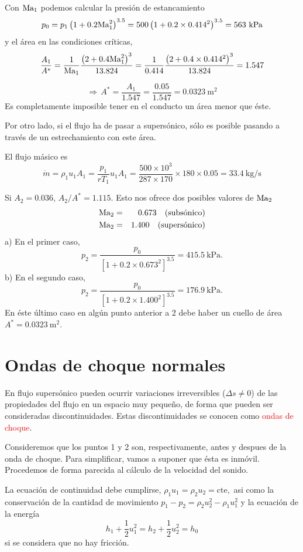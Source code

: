 		Con $\text{Ma}_{1}$ podemos calcular la presión de estancamiento 
		\[
		p_{0}=p_{1}\left(1+0.2\text{Ma}_{1}^{2}\right)^{3.5}=500\left(1+0.2\times0.414^{2}\right)^{3.5}=563~\text{kPa}
		\]
		y el área en las condiciones críticas, 
		\[
		\frac{A_{1}}{A^{*}}=\frac{1}{\text{Ma}_{1}}\frac{\left(2+0.4\text{Ma}_{1}^{2}\right)^{3}}{13.824}=\frac{1}{0.414}\frac{\left(2+0.4\times0.414^{2}\right)^{3}}{13.824}=1.547
		\]
		
		\[
		\Rightarrow\,A^{*}=\frac{A_{1}}{1.547}=\frac{0.05}{1.547}=0.0323~\text{m}^{2}
		\]
		Es completamente imposible tener en el conducto un área menor que
		éste.
		
		Por otro lado, si el flujo ha de pasar a supersónico, sólo es posible
		pasando a través de un estrechamiento con este área.
		
		El flujo másico es 
		\[
		\dot{m}=\rho_{1}u_{1}A_{1}=\frac{p_{1}}{rT_{1}}u_{1}A_{1}=\frac{500\times10^{3}}{287\times170}\times180\times0.05=33.4~\text{kg/s}
		\]

		Si $A_{2}=0.036$, $A_{2}/A^{*}=1.115$. Esto nos ofrece dos posibles
		valores de $\text{Ma}_{2}$ 
		\begin{eqnarray*}
			\text{Ma}_{2} & = & 0.673\quad\text{(subsónico)}\\
			\text{Ma}_{2} & = & 1.400\quad\text{(supersónico)}
		\end{eqnarray*}
		a) En el primer caso, 
		\[
		p_{2}=\frac{p_{0}}{\left[1+0.2\times0.673^{2}\right]^{3.5}}=415.5~\text{kPa}.
		\]
		b) En el segundo caso, 
		\[
		p_{2}=\frac{p_{0}}{\left[1+0.2\times1.400^{2}\right]^{3.5}}=176.9~\text{kPa}.
		\]
		En éste último caso en algún punto anterior a 2 debe haber un cuello
		de área $A^{*}=0.0323~\text{m}^{2}$.


\section{Ondas de choque normales}
	
	En flujo supersónico pueden ocurrir variaciones irreversibles ($\Delta s\neq0$)
	de las propiedades del flujo en un espacio muy pequeño, de forma que
	pueden ser consideradas discontinuidades. Estas discontinuidades se
	conocen como \textcolor{red}{ondas de choque}.
	
	Consideremos que los puntos 1 y 2 son, respectivamente, antes y despues
	de la onda de choque. Para simplificar, vamos a suponer que ésta es
	inmóvil. Procedemos de forma parecida al cálculo de la velocidad del
	sonido.
	
	La ecuación de continuidad debe cumplirse, $\rho_{1}u_{1}=\rho_{2}u_{2}=\text{cte},$
	asi como la conservación de la cantidad de movimiento $p_{1}-p_{2}=\rho_{2}u_{2}^{2}-\rho_{1}u_{1}^{2}$
	y la ecuación de la energía 
\begin{equation}
		h_{1}+\frac{1}{2}u_{1}^{2}=h_{2}+\frac{1}{2}u_{2}^{2}=h_{0}
\end{equation}
	si se considera que no hay fricción.

